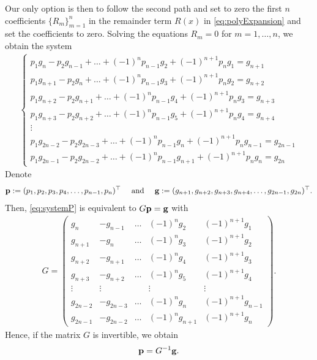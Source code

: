 \documentclass[a4paper]{article}
\numberwithin{equation}{section}
\begin{document}
{Our only option is then to follow the second path and set to zero the first $n$ coefficients $\{R_m\}_{m=1}^n$ in the remainder term $R(x)$ in \eqref{eq:polyExpansion} and set the coefficients to zero. Solving the equations $R_m=0$ for $m=1,\ldots,n$, we obtain the system
\begin{align}\label{eq:systemP}
	\begin{cases}
		p_1g_n - p_2g_{n-1} + \ldots + (-1)^np_{n-1}g_2 + (-1)^{n+1}p_ng_1 = g_{n+1}
		\\
		p_1g_{n+1} - p_2g_n + \ldots + (-1)^np_{n-1}g_3 + (-1)^{n+1}p_ng_2 = g_{n+2}
		\\
		p_1g_{n+2} - p_2g_{n+1} + \ldots+(-1)^np_{n-1}g_4 + (-1)^{n+1}p_ng_3 = g_{n+3}
		\\
		p_1g_{n+3} - p_2g_{n+2} + \ldots+(-1)^np_{n-1}g_5 + (-1)^{n+1}p_ng_4 = g_{n+4}
		\\
		\vdots
		\\
		p_1g_{2n-2} - p_2g_{2n-3} + \ldots+(-1)^np_{n-1}g_n + (-1)^{n+1}p_ng_{n-1} = g_{2n-1}
		\\
		p_1g_{2n-1} - p_2g_{2n-2} + \ldots+(-1)^np_{n-1}g_{n+1} + (-1)^{n+1}p_ng_n = g_{2n}
	\end{cases}
\end{align}
Denote 
\begin{align*}
	{\bf{p}} := (p_1,p_2,p_3,p_4,\ldots,p_{n-1},p_n)^\top \quad\mbox{ and } \quad {\bf{g}} := (g_{n+1},g_{n+2},g_{n+3},g_{n+4},\ldots,g_{2n-1},g_{2n})^\top.
\end{align*}
Then, \eqref{eq:systemP} is equivalent to $G{\bf{p}} = {\bf{g}}$ with
\begin{align}\label{eq:matrixG}
	G = \left(\begin{matrix}
		g_n & -g_{n-1} & \ldots & (-1)^ng_2 & (-1)^{n+1}g_1 
		\\
		g_{n+1} & -g_n & \ldots & (-1)^ng_3 & (-1)^{n+1}g_2
		\\
		g_{n+2} & -g_{n+1} & \ldots & (-1)^ng_4 & (-1)^{n+1}g_3
		\\
		g_{n+3} & - g_{n+2} & \ldots & (-1)^ng_5 & (-1)^{n+1}g_4
		\\
		\vdots & \vdots & & \vdots & \vdots
		\\
		g_{2n-2} & -g_{2n-3} & \ldots & (-1)^ng_n & (-1)^{n+1}g_{n-1}
		\\
		g_{2n-1} & -g_{2n-2} & \ldots & (-1)^ng_{n+1} & (-1)^{n+1}g_n 
	\end{matrix}\right).
\end{align}
Hence, if the matrix $G$ is invertible, we obtain 
\begin{align}\label{eq:coefficientsP}
	{\bf{p}} = G^{-1}{\bf{g}}.
\end{align}

}
\end{document}
